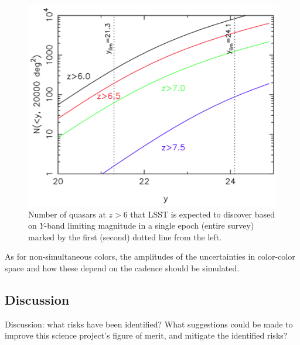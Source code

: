 \begin{figure}
\includegraphics[width=5.0in]{figs/agn/zgt6_figure_AAS_2013.tiff}
\caption{Number of quasars at $z>6$ that LSST is expected to discover
based on $Y$-band limiting magnitude in a single epoch (entire survey)
marked by the first (second) dotted line from the left.}
\label{fig:zgt6}
\end{figure}

As for non-simultaneous colors, the amplitudes of the uncertainties in color-color
space and how these depend on the cadence should be simulated.


\subsection{Discussion}
\label{sec:\secname:discussion}

Discussion: what risks have been identified? What suggestions could be
made to improve this science project's figure of merit, and mitigate
the identified risks?



\navigationbar
